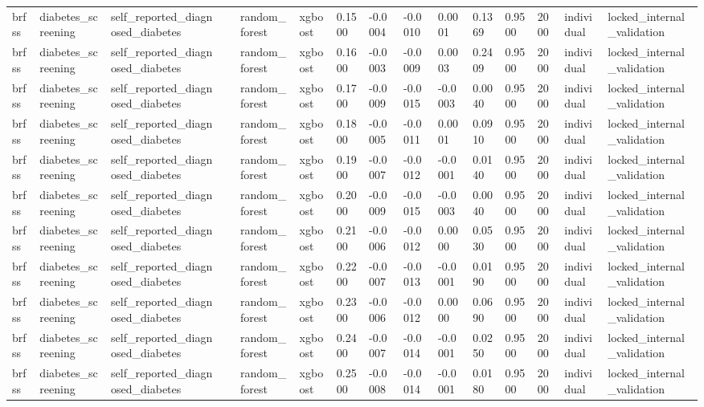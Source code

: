 \begin{tabular}{lllllllllllllll}
brfss & diabetes\_screening & self\_reported\_diagnosed\_diabetes &  & random\_forest & xgboost & 0.1500 & -0.0004 & -0.0010 & 0.0001 & 0.1369 & 0.9500 & 2000 & individual & locked\_internal\_validation \\
brfss & diabetes\_screening & self\_reported\_diagnosed\_diabetes &  & random\_forest & xgboost & 0.1600 & -0.0003 & -0.0009 & 0.0003 & 0.2409 & 0.9500 & 2000 & individual & locked\_internal\_validation \\
brfss & diabetes\_screening & self\_reported\_diagnosed\_diabetes &  & random\_forest & xgboost & 0.1700 & -0.0009 & -0.0015 & -0.0003 & 0.0040 & 0.9500 & 2000 & individual & locked\_internal\_validation \\
brfss & diabetes\_screening & self\_reported\_diagnosed\_diabetes &  & random\_forest & xgboost & 0.1800 & -0.0005 & -0.0011 & 0.0001 & 0.0910 & 0.9500 & 2000 & individual & locked\_internal\_validation \\
brfss & diabetes\_screening & self\_reported\_diagnosed\_diabetes &  & random\_forest & xgboost & 0.1900 & -0.0007 & -0.0012 & -0.0001 & 0.0140 & 0.9500 & 2000 & individual & locked\_internal\_validation \\
brfss & diabetes\_screening & self\_reported\_diagnosed\_diabetes &  & random\_forest & xgboost & 0.2000 & -0.0009 & -0.0015 & -0.0003 & 0.0040 & 0.9500 & 2000 & individual & locked\_internal\_validation \\
brfss & diabetes\_screening & self\_reported\_diagnosed\_diabetes &  & random\_forest & xgboost & 0.2100 & -0.0006 & -0.0012 & 0.0000 & 0.0530 & 0.9500 & 2000 & individual & locked\_internal\_validation \\
brfss & diabetes\_screening & self\_reported\_diagnosed\_diabetes &  & random\_forest & xgboost & 0.2200 & -0.0007 & -0.0013 & -0.0001 & 0.0190 & 0.9500 & 2000 & individual & locked\_internal\_validation \\
brfss & diabetes\_screening & self\_reported\_diagnosed\_diabetes &  & random\_forest & xgboost & 0.2300 & -0.0006 & -0.0012 & 0.0000 & 0.0690 & 0.9500 & 2000 & individual & locked\_internal\_validation \\
brfss & diabetes\_screening & self\_reported\_diagnosed\_diabetes &  & random\_forest & xgboost & 0.2400 & -0.0007 & -0.0014 & -0.0001 & 0.0250 & 0.9500 & 2000 & individual & locked\_internal\_validation \\
brfss & diabetes\_screening & self\_reported\_diagnosed\_diabetes &  & random\_forest & xgboost & 0.2500 & -0.0008 & -0.0014 & -0.0001 & 0.0180 & 0.9500 & 2000 & individual & locked\_internal\_validation \\

\end{tabular}
